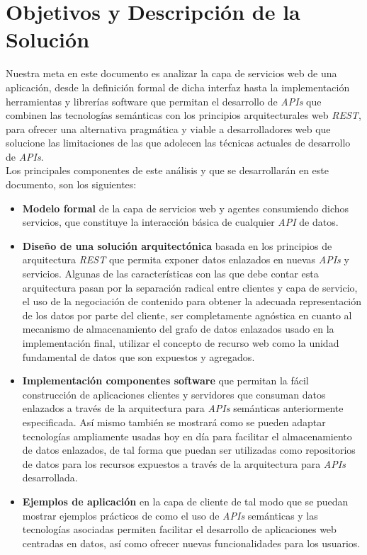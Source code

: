 \chapter{Objetivos y Descripci\'on de la Soluci\'on}

Nuestra meta en este documento es analizar la capa de servicios web de una aplicaci\'on, desde la definici\'on formal de dicha interfaz hasta la implementaci\'on herramientas y librer\'ias software que permitan el desarrollo de \textit{APIs} que combinen las tecnolog\'ias sem\'anticas con los principios arquitecturales web \textit{REST}, para ofrecer una alternativa pragm\'atica y viable a desarrolladores web que solucione las limitaciones de las que adolecen las t\'ecnicas actuales de desarrollo de \textit{APIs}.\\
Los principales componentes de este an\'alisis y que se desarrollar\'an en este documento, son los siguientes:\\

\begin{itemize}

\item \textbf{Modelo formal} de la capa de servicios web y agentes consumiendo dichos servicios, que constituye la interacci\'on b\'asica de cualquier \textit{API} de datos.

\item \textbf{Dise\~no de una soluci\'on arquitect\'onica} basada en los principios de arquitectura \textit{REST} que permita exponer datos enlazados en nuevas \textit{APIs} y servicios. Algunas de las caracter\'isticas con las que debe contar esta arquitectura pasan por la separaci\'on radical entre clientes y capa de servicio, el uso de la negociaci\'on de contenido para obtener la adecuada representaci\'on de los datos por parte del cliente, ser completamente agn\'ostica en cuanto al mecanismo  de almacenamiento del grafo de datos enlazados usado en la implementaci\'on final, utilizar el concepto de recurso web como la unidad fundamental de datos que son expuestos y agregados.

\item \textbf{Implementaci\'on componentes software} que permitan la f\'acil construcci\'on de aplicaciones clientes y servidores que consuman datos enlazados a trav\'es de la arquitectura para \textit{APIs} sem\'anticas anteriormente especificada. As\'i mismo tambi\'en se mostrar\'a como se pueden adaptar tecnolog\'ias  ampliamente usadas hoy en d\'ia para facilitar el almacenamiento de datos enlazados, de tal forma que puedan ser utilizadas como repositorios de datos para los recursos expuestos a trav\'es de la arquitectura para \textit{APIs} desarrollada.

\item \textbf{Ejemplos de aplicaci\'on} en la capa de cliente de tal modo que se puedan mostrar ejemplos pr\'acticos de como el uso de \textit{APIs} sem\'anticas y las tecnolog\'ias asociadas permiten facilitar el desarrollo de aplicaciones web centradas en datos, as\'i como ofrecer nuevas funcionalidades para los usuarios.

\end{itemize}

